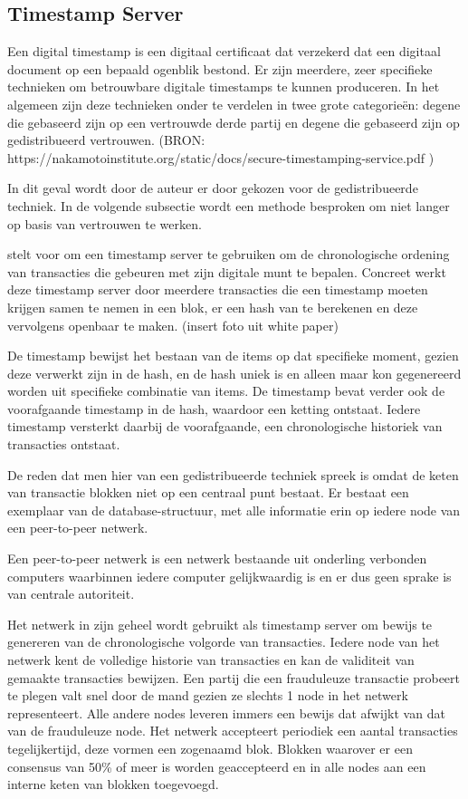 	\subsection{Timestamp Server}
	Een digital timestamp is een digitaal certificaat dat verzekerd dat een digitaal document op een bepaald ogenblik bestond. Er zijn meerdere, zeer specifieke technieken om betrouwbare digitale timestamps te kunnen produceren. In het algemeen zijn deze technieken onder te verdelen in twee grote categorieën: degene die gebaseerd zijn op een vertrouwde derde partij en degene die gebaseerd zijn op gedistribueerd vertrouwen. (BRON: https://nakamotoinstitute.org/static/docs/secure-timestamping-service.pdf )
	
	In dit geval wordt door de auteur er door \textcite{Nakamoto2008} gekozen voor de gedistribueerde techniek. In de volgende subsectie wordt een methode besproken om niet langer op basis van vertrouwen te werken.
	
	\textcite{Nakamoto2008} stelt voor om een timestamp server te gebruiken om de chronologische ordening van transacties die gebeuren met zijn digitale munt te bepalen.  Concreet werkt deze timestamp server door meerdere transacties die een timestamp moeten krijgen samen te nemen in een blok, er een hash van te berekenen en deze vervolgens openbaar te maken. (insert foto uit white paper)
	
	De timestamp bewijst het bestaan van de items op dat specifieke moment, gezien deze verwerkt zijn in de hash, en de hash uniek is en alleen maar kon gegenereerd worden uit specifieke combinatie van items. De timestamp bevat verder ook de voorafgaande timestamp in de hash, waardoor een ketting ontstaat. Iedere timestamp versterkt daarbij de voorafgaande, een chronologische historiek van transacties ontstaat.
	
	De reden dat men hier van een gedistribueerde techniek spreek is omdat de keten van transactie blokken niet op een centraal punt bestaat. Er bestaat een exemplaar van de database-structuur, met alle informatie erin op iedere node van een peer-to-peer netwerk. 
	
	Een peer-to-peer netwerk is een netwerk bestaande uit onderling verbonden computers waarbinnen iedere computer gelijkwaardig is en er dus geen sprake is van centrale autoriteit. 
	
	Het netwerk in zijn geheel wordt gebruikt als timestamp server om bewijs te genereren van de chronologische volgorde van transacties. Iedere node van het netwerk kent de volledige historie van transacties en kan de validiteit van gemaakte transacties bewijzen. Een partij die een frauduleuze transactie probeert te plegen valt snel door de mand gezien ze slechts 1 node in het netwerk representeert. Alle andere nodes leveren immers een bewijs dat afwijkt van dat van de frauduleuze node. Het netwerk accepteert periodiek een aantal transacties tegelijkertijd, deze vormen een zogenaamd blok. Blokken waarover er een consensus van 50\% of meer is worden geaccepteerd en in alle nodes aan een interne keten van blokken toegevoegd.
	
